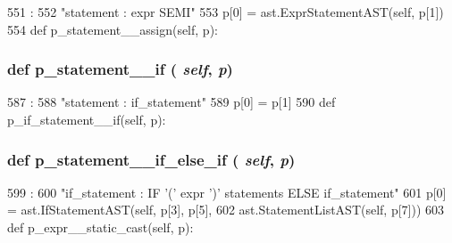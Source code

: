 \begin{DoxyVerb}
\begin{DoxyCode}
551                                         :
552         "statement : expr SEMI"
553         p[0] = ast.ExprStatementAST(self, p[1])
554 
    def p_statement__assign(self, p):
\end{DoxyCode}
\hypertarget{classslicc_1_1parser_1_1SLICC_ac287a4eaf1f470dda1b42833534325c0}{
\subsubsection[{p\_\-statement\_\-\_\-if}]{\setlength{\rightskip}{0pt plus 5cm}def p\_\-statement\_\-\_\-if ( {\em self}, \/   {\em p})}}
\label{classslicc_1_1parser_1_1SLICC_ac287a4eaf1f470dda1b42833534325c0}



\begin{DoxyCode}
587                                 :
588         "statement : if_statement"
589         p[0] = p[1]
590 
    def p_if_statement__if(self, p):
\end{DoxyCode}
\hypertarget{classslicc_1_1parser_1_1SLICC_a88b968b14aa256d7c90f277a2557cb8c}{
\subsubsection[{p\_\-statement\_\-\_\-if\_\-else\_\-if}]{\setlength{\rightskip}{0pt plus 5cm}def p\_\-statement\_\-\_\-if\_\-else\_\-if ( {\em self}, \/   {\em p})}}
\label{classslicc_1_1parser_1_1SLICC_a88b968b14aa256d7c90f277a2557cb8c}



\begin{DoxyCode}
599                                         :
600         "if_statement : IF '(' expr ')' statements ELSE if_statement"
601         p[0] = ast.IfStatementAST(self, p[3], p[5],
602                                   ast.StatementListAST(self, p[7]))
603 
    def p_expr__static_cast(self, p):
\end{DoxyCode}
\hypertarget{classslicc_1_1parser_1_1SLICC_a015764d4d63d518e62c8b10217683dee}{
}
\end{DoxyVerb}
